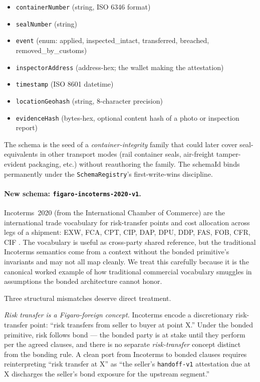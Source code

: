 \documentclass[11pt,a4paper]{article}
\theoremstyle{definition}
\theoremstyle{remark}
\begin{document}
\begin{itemize}
  \item \texttt{containerNumber} (string, ISO 6346 format)
  \item \texttt{sealNumber} (string)
  \item \texttt{event} (enum: applied, inspected\_intact,
    transferred, breached, removed\_by\_customs)
  \item \texttt{inspectorAddress} (address-hex; the wallet
    making the attestation)
  \item \texttt{timestamp} (ISO 8601 datetime)
  \item \texttt{locationGeohash} (string, 8-character precision)
  \item \texttt{evidenceHash} (bytes-hex, optional content hash
    of a photo or inspection report)
\end{itemize}

The schema is the seed of a \emph{container-integrity} family
that could later cover seal-equivalents in other transport modes
(rail container seals, air-freight tamper-evident packaging, etc.)
without reauthoring the family. The schemaId binds permanently
under the \texttt{SchemaRegistry}'s first-write-wins discipline.

\paragraph{New schema: \texttt{figaro-incoterms-2020-v1}.}
Incoterms~2020 (from the International Chamber of Commerce) are
the international trade vocabulary for risk-transfer points and
cost allocation across legs of a shipment: EXW, FCA, CPT, CIP,
DAP, DPU, DDP, FAS, FOB, CFR, CIF
\citep{icc_incoterms_2020, ramberg2010icc}. The vocabulary is
useful as cross-party shared reference, but the traditional
Incoterms semantics come from a context without the bonded
primitive's invariants and may not all map cleanly. We treat
this carefully because it is the canonical worked example of
how traditional commercial vocabulary smuggles in assumptions
the bonded architecture cannot honor.

Three structural mismatches deserve direct treatment.

\emph{Risk transfer is a Figaro-foreign concept.} Incoterms
encode a discretionary risk-transfer point: ``risk transfers from
seller to buyer at point X.'' Under the bonded primitive, risk
follows bond --- the bonded party is at stake until they perform
per the agreed clauses, and there is no separate
\emph{risk-transfer} concept distinct from the bonding rule. A
clean port from Incoterms to bonded clauses requires reinterpreting
``risk transfer at X'' as ``the seller's
\texttt{handoff-v1} attestation due at X discharges the seller's
bond exposure for the upstream segment.''
\end{document}
